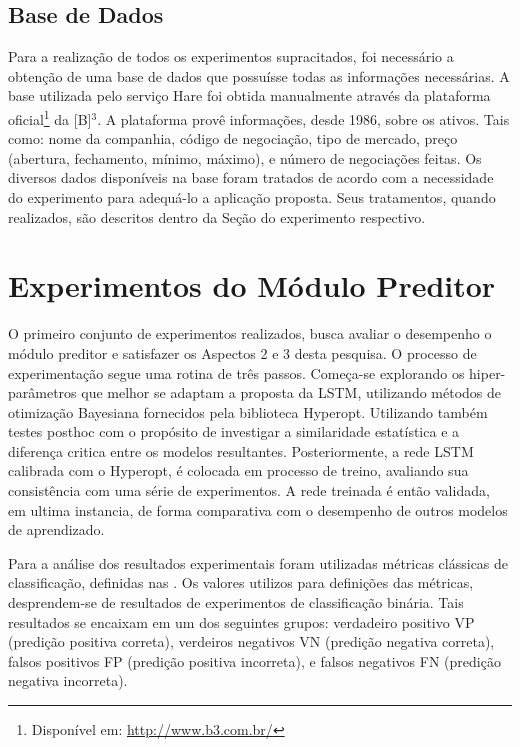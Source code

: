 
\subsection{Base de Dados}
\label{SEC:data-set}

Para a realização de todos os experimentos supracitados, foi necessário a obtenção de uma base de dados que possuísse todas as informações necessárias. A base utilizada pelo serviço Hare foi obtida manualmente através da plataforma oficial\footnote{Disponível em: \url{http://www.b3.com.br/}} da [B]$^3$. A plataforma provê informações, desde 1986, sobre os ativos. Tais como: nome da companhia, código de negociação, tipo de mercado, preço (abertura, fechamento, mínimo, máximo), e número de negociações feitas. Os diversos dados disponíveis na base foram tratados de acordo com a necessidade do experimento para adequá-lo a aplicação proposta. Seus tratamentos, quando realizados, são descritos dentro da Seção do experimento respectivo.

\section{Experimentos do Módulo Preditor}
\label{exp:mp}

O primeiro conjunto de experimentos realizados, busca avaliar o desempenho o módulo preditor e satisfazer os Aspectos 2 e 3 desta pesquisa. O processo de experimentação segue uma rotina de três passos. Começa-se explorando os hiper-parâmetros que melhor se adaptam a proposta da \acrshort{LSTM}, utilizando métodos de otimização Bayesiana fornecidos pela biblioteca Hyperopt. Utilizando também testes posthoc com o propósito de investigar a similaridade estatística e a diferença critica entre os modelos resultantes. Posteriormente, a rede \acrshort{LSTM} calibrada com o Hyperopt, é colocada em processo de treino, avaliando sua consistência com uma série de experimentos. A rede treinada é então validada, em ultima instancia, de forma comparativa com o desempenho de outros modelos de aprendizado.


Para a análise dos resultados experimentais foram utilizadas métricas clássicas de classificação, definidas nas . Os valores utilizos para definições das métricas, desprendem-se de resultados de experimentos de classificação binária. Tais resultados se encaixam em um dos seguintes grupos: verdadeiro positivo VP (predição positiva correta), verdeiros negativos VN (predição negativa correta), falsos positivos FP (predição positiva incorreta), e falsos negativos FN (predição negativa incorreta). 


